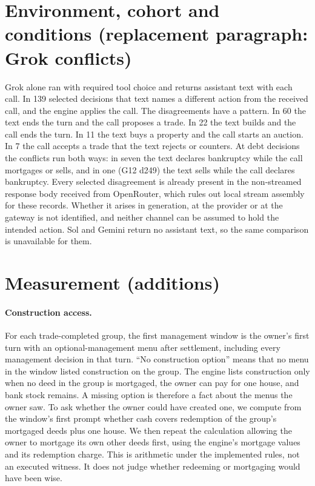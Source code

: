 \section{Environment, cohort and conditions (replacement paragraph: Grok conflicts)}

Grok alone ran with required tool choice and returns assistant text with each call. In 139 selected decisions that text names a different action from the received call, and the engine applies the call. The disagreements have a pattern. In 60 the text ends the turn and the call proposes a trade. In 22 the text builds and the call ends the turn. In 11 the text buys a property and the call starts an auction. In 7 the call accepts a trade that the text rejects or counters. At debt decisions the conflicts run both ways: in seven the text declares bankruptcy while the call mortgages or sells, and in one (G12 d249) the text sells while the call declares bankruptcy. Every selected disagreement is already present in the non-streamed response body received from OpenRouter, which rules out local stream assembly for these records. Whether it arises in generation, at the provider or at the gateway is not identified, and neither channel can be assumed to hold the intended action. Sol and Gemini return no assistant text, so the same comparison is unavailable for them.

\section{Measurement (additions)}

\paragraph{Construction access.} For each trade-completed group, the first management window is the owner's first turn with an optional-management menu after settlement, including every management decision in that turn. ``No construction option'' means that no menu in the window listed construction on the group. The engine lists construction only when no deed in the group is mortgaged, the owner can pay for one house, and bank stock remains. A missing option is therefore a fact about the menus the owner saw. To ask whether the owner could have created one, we compute from the window's first prompt whether cash covers redemption of the group's mortgaged deeds plus one house. We then repeat the calculation allowing the owner to mortgage its own other deeds first, using the engine's mortgage values and its redemption charge. This is arithmetic under the implemented rules, not an executed witness. It does not judge whether redeeming or mortgaging would have been wise.

